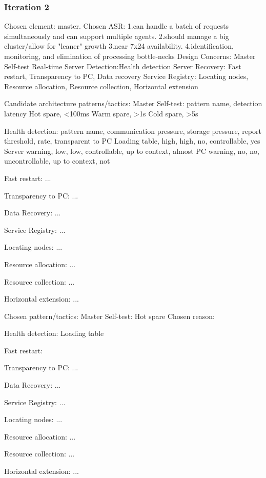 \documentclass{article}
\begin{document}
		\subsubsection{Iteration 2}
		Chosen element: master.
		Chosen ASR: 
		1.can handle a batch of requests simultaneously and can support multiple agents.
		2.should manage a big cluster/allow for "leaner" growth
		3.near 7x24 availability.
		4.identification, monitoring, and elimination of processing bottle-necks
		Design Concerns:
		Master Self-test
		Real-time Server Detection:Health detection
		Server Recovery: Fast restart, Transparency to PC, Data recovery
		Service Registry: Locating nodes, Resource allocation, Resource collection, Horizontal extension

		Candidate architecture patterns/tactics:
		Master Self-test:
			pattern name, detection latency
			Hot spare, <100ms
			Warm spare, >1s
			Cold spare, >5s

		Health detection:
			pattern name, communication pressure, storage pressure, report threshold, rate, transparent to PC
			Loading table, high, high, no, controllable, yes 
			Server warning, low, low, controllable, up to context, almost
			PC warning, no, no, uncontrollable, up to context, not
		
		Fast restart:
			...
		
		Transparency to PC:
			...
		
		Data Recovery:
			...
		
		Service Registry:
			...
		
		Locating nodes:
			... 

		Resource allocation:
			...

		Resource collection:
			... 

		Horizontal extension:
			...

		Chosen pattern/tactics:
			Master Self-test:
				Hot spare
			Chosen reason: 

			Health detection:
				Loading table
			
			Fast restart:
				
			
			Transparency to PC:
				...
			
			Data Recovery:
				...
			
			Service Registry:
				...
			
			Locating nodes:
				... 

			Resource allocation:
				...

			Resource collection:
				... 

			Horizontal extension:
				...
		
\end{document}
